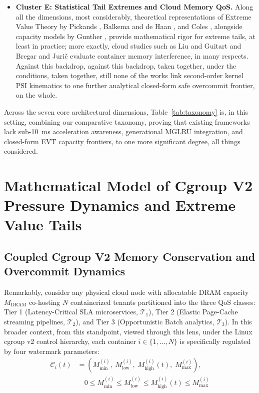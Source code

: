 \documentclass[pdflatex,sn-mathphys,Numbered]{sn-jnl}
\begin{document}
\begin{itemize}
    \item \textbf{Cluster E: Statistical Tail Extremes and Cloud Memory QoS.} Along all the dimensions, most considerably, theoretical representations of Extreme Value Theory by Pickands \cite{pickands1975gpd}, Balkema and de Haan \cite{balkema1974residual}, and Coles \cite{coles2001evt}, alongside capacity models by Gunther \cite{gunther2007usl}, provide mathematical rigor for extreme tails, at least in practice; more exactly, cloud studies such as Liu and Guitart \cite{liu2021hpc} and Bregar and Juri\v{c} \cite{bregar2024cluster} evaluate container memory interference, in many respects. Against this backdrop, against this backdrop, taken together, under the conditions, taken together, still none of the works link second-order kernel PSI kinematics to one further analytical closed-form safe overcommit frontier, on the whole.
\end{itemize}

Across the seven core architectural dimensions, Table~\ref{tab:taxonomy} is, in this setting, combining our comparative taxonomy, proving that existing frameworks lack sub-10~ms acceleration awareness, generational MGLRU integration, and closed-form EVT capacity frontiers, to one more significant degree, all things considered.



\section{Mathematical Model of Cgroup V2 Pressure Dynamics and Extreme Value Tails}
\label{sec:theory}

\subsection{Coupled Cgroup V2 Memory Conservation and Overcommit Dynamics}
Remarkably, consider any physical cloud node with allocatable DRAM capacity $M_{\text{DRAM}}$ co-hosting $N$ containerized tenants partitioned into the three QoS classes: Tier 1 (Latency-Critical SLA microservices, $\mathcal{T}_1$), Tier 2 (Elastic Page-Cache streaming pipelines, $\mathcal{T}_2$), and Tier 3 (Opportunistic Batch analytics, $\mathcal{T}_3$). In this broader context, from this standpoint, viewed through this lens, under the Linux cgroup v2 control hierarchy, each container $i \in \{1, \dots, N\}$ is specifically regulated by four watermark parameters:
\begin{equation}
\begin{aligned}
\mathcal{C}_i(t) &= \left( M_{\text{min}}^{(i)}, \; M_{\text{low}}^{(i)}, \; M_{\text{high}}^{(i)}(t), \; M_{\text{max}}^{(i)} \right), \\
&\quad 0 \le M_{\text{min}}^{(i)} \le M_{\text{low}}^{(i)} \le M_{\text{high}}^{(i)}(t) \le M_{\text{max}}^{(i)}
\end{aligned}
\label{eq:cgroup_params}
\end{equation}
\end{document}

